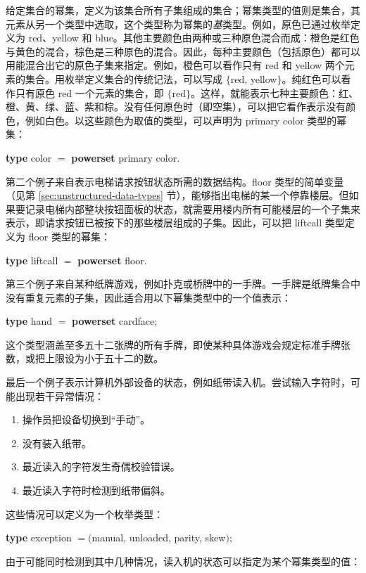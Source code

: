 给定集合的幂集，定义为该集合所有子集组成的集合；幂集类型的值则是集合，其元素从另一个类型中选取，这个类型称为幂集的\textit{基}类型。例如，原色已通过枚举定义为 red、yellow 和 blue。其他主要颜色由两种或三种原色混合而成：橙色是红色与黄色的混合，棕色是三种原色的混合。因此，每种主要颜色（包括原色）都可以用能混合出它的原色子集来指定。例如，橙色可以看作只有 red 和 yellow 两个元素的集合。用枚举定义集合的传统记法，可以写成 $\{$red, yellow$\}$。纯红色可以看作只有原色 red 一个元素的集合，即 $\{$red$\}$。这样，就能表示七种主要颜色：红、橙、黄、绿、蓝、紫和棕。没有任何原色时（即空集），可以把它看作表示没有颜色，例如白色。以这些颜色为取值的类型，可以声明为 primary color 类型的幂集：

\quad \textbf{type} color $=$ \textbf{powerset} primary color.

第二个例子来自表示电梯请求按钮状态所需的数据结构。floor 类型的简单变量（见第 \ref{sec:unstructured-data-types} 节），能够指出电梯的某一个停靠楼层。但如果要记录电梯内部整块按钮面板的状态，就需要用楼内所有可能楼层的一个子集来表示，即请求按钮已被按下的那些楼层组成的子集。因此，可以把 liftcall 类型定义为 floor 类型的幂集：

\quad \textbf{type} liftcall $=$ \textbf{powerset} floor.

第三个例子来自某种纸牌游戏，例如扑克或桥牌中的一手牌。一手牌是纸牌集合中没有重复元素的子集，因此适合用以下幂集类型中的一个值表示：

\quad \textbf{type} hand $=$ \textbf{powerset} cardface;

\noindent
这个类型涵盖至多五十二张牌的所有手牌，即使某种具体游戏会规定标准手牌张数，或把上限设为小于五十二的数。

最后一个例子表示计算机外部设备的状态，例如纸带读入机。尝试输入字符时，可能出现若干异常情况：

\begin{enumerate}[wide, nosep, label=(\arabic*)]
	\item 操作员把设备切换到“手动”。
	\item 没有装入纸带。
	\item 最近读入的字符发生奇偶校验错误。
	\item 最近读入字符时检测到纸带偏斜。
\end{enumerate}

\noindent
这些情况可以定义为一个枚举类型：

\quad \textbf{type} exception $= ($manual, unloaded, parity, skew$)$; 

\noindent
由于可能同时检测到其中几种情况，读入机的状态可以指定为某个幂集类型的值：

